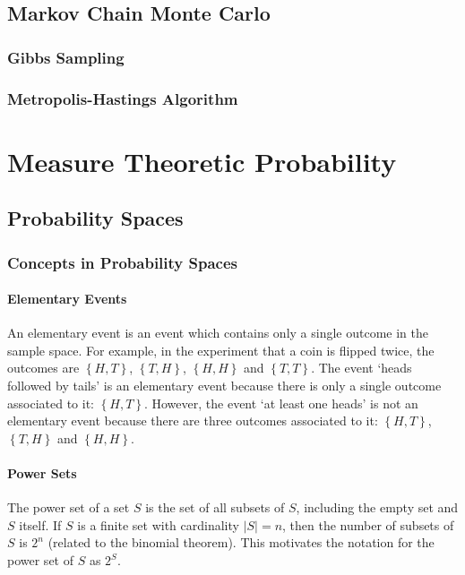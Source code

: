 \documentclass[11pt]{report} %
\begin{document}
\section{Markov Chain Monte Carlo}

\subsection{Gibbs Sampling}

\subsection{Metropolis-Hastings Algorithm}

\chapter{Measure Theoretic Probability}

\section{Probability Spaces}

\subsection{Concepts in Probability Spaces}

\subsubsection{Elementary Events}
An elementary event is an event which contains only a single outcome in the sample space. For example, in the experiment that a coin is flipped twice, the outcomes are $\left\{H, T\right\}$, $\left\{T, H\right\}$, $\left\{H, H\right\}$ and $\left\{T, T\right\}$. The event `heads followed by tails' is an elementary event because there is only a single outcome associated to it: $\left\{H, T\right\}$. However, the event `at least one heads' is not an elementary event because there are three outcomes associated to it: $\left\{H, T\right\}$, $\left\{T, H\right\}$ and $\left\{H, H\right\}$.

\subsubsection{Power Sets}
The power set of a set $S$ is the set of all subsets of $S$, including the empty set and $S$ itself. If $S$ is a finite set with cardinality $\left|S\right| = n$, then the number of subsets of $S$ is $2^{n}$ (related to the binomial theorem). This motivates the notation for the power set of $S$ as $2^{S}$. \\
\end{document}
